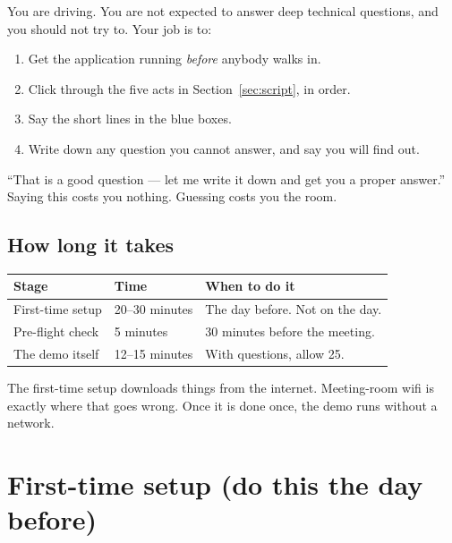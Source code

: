 \documentclass[11pt,a4paper]{article}
\begin{document}
You are driving. You are not expected to answer deep technical questions, and
you should not try to. Your job is to:

\begin{enumerate}[leftmargin=*]
  \item Get the application running \emph{before} anybody walks in.
  \item Click through the five acts in Section~\ref{sec:script}, in order.
  \item Say the short lines in the blue boxes.
  \item Write down any question you cannot answer, and say you will find out.
\end{enumerate}

\begin{say}
``That is a good question --- let me write it down and get you a proper
answer.''\\[4pt]
Saying this costs you nothing. Guessing costs you the room.
\end{say}

\subsection{How long it takes}

\begin{longtable}{@{}p{5.2cm}p{3cm}p{7cm}@{}}
\toprule
\textbf{Stage} & \textbf{Time} & \textbf{When to do it} \\
\midrule
\endhead
First-time setup & 20--30 minutes & The day before. Not on the day. \\
Pre-flight check & 5 minutes & 30 minutes before the meeting. \\
The demo itself & 12--15 minutes & With questions, allow 25. \\
\bottomrule
\end{longtable}

\begin{careful}
The first-time setup downloads things from the internet. Meeting-room wifi is
exactly where that goes wrong. Once it is done once, the demo runs without a
network.
\end{careful}

\section{First-time setup (do this the day before)}
\end{document}
